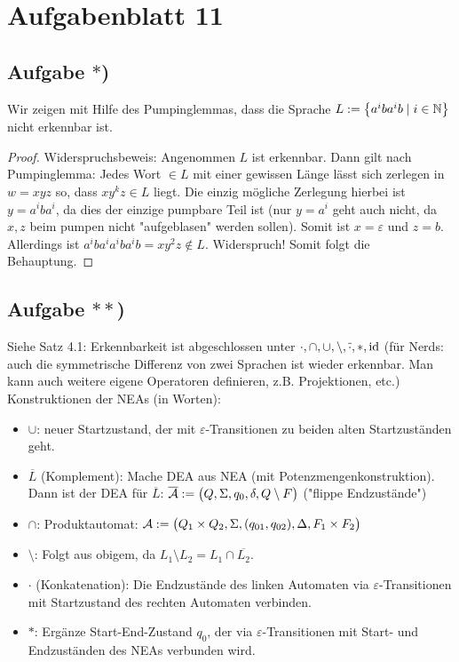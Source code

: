 
\section{Aufgabenblatt 11}
\subsection*{Aufgabe $\ast$)}
Wir zeigen mit Hilfe des Pumpinglemmas, dass die Sprache $L:=\big\lbrace a^i ba^ib\mid i\in\mathbb{N}\big\rbrace$ nicht erkennbar ist.

\begin{proof}
	Widerspruchsbeweis: Angenommen $L$ ist erkennbar. Dann gilt nach Pumping\-lemma:
	Jedes Wort $\in L$ mit einer gewissen Länge lässt sich zerlegen in $w=xyz$ so, dass $xy^k z\in L$ liegt.
	Die einzig mögliche Zerlegung hierbei ist $y=a^iba^i$, da dies der einzige pumpbare Teil ist (nur $y=a^i$ geht auch nicht, da $x,z$ beim pumpen nicht "aufgeblasen" werden sollen).
	Somit ist $x=\varepsilon$ und $z=b$.
	Allerdings ist $a^iba^ia^ib a^ib=xy^2z\not\in L$.
	Widerspruch! Somit folgt die Behauptung.
\end{proof}

\subsection*{Aufgabe $\ast\ast$)}
Siehe Satz 4.1: 
Erkennbarkeit ist abgeschlossen unter $\cdot,\cap,\cup,\setminus,\overline{\cdot},\ast,\operatorname{id}$ (für Nerds: auch die symmetrische Differenz von zwei Sprachen ist wieder erkennbar. Man kann auch weitere eigene Operatoren definieren, z.B. Projektionen, etc.)\\
Konstruktionen der NEAs (in Worten):
\begin{itemize}
	\item $\cup$: neuer Startzustand, der mit $\varepsilon$-Transitionen zu beiden alten Startzuständen geht.
	\item $\overline{L}$ (Komplement): Mache DEA aus NEA (mit Potenzmengenkonstruktion).
	Dann ist der DEA für $\overline{L}$: $\overline{\mathcal{A}}:=\big(Q,\Sigma,q_0,\delta,Q\setminus F\big)$ ("flippe Endzustände")
	\item $\cap$: Produktautomat: $\mathcal{A}:=\big(Q_1\times Q_2,\Sigma,(q_{01},q_{02}),\Delta,F_1\times F_2\big)$
	\item $\setminus$: Folgt aus obigem, da $L_1\setminus L_2=L_1\cap\overline{L_2}$.
	\item $\cdot$ (Konkatenation): Die Endzustände des linken Automaten via $\varepsilon$-Transitionen mit Startzustand des rechten Automaten verbinden.
	\item $\ast$: Ergänze Start-End-Zustand $q_0$, der via $\varepsilon$-Transitionen mit Start- und Endzuständen des NEAs verbunden wird.
\end{itemize}

